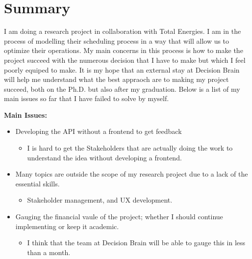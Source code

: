 \section*{Summary}
I am doing a research project in collaboration with Total Energies. I am in the process of modelling 
their scheduling process in a way that will allow us to optimize their operations. My main concerns
in this process is how to make the project succeed with the numerous decision that I have to make but 
which I feel poorly equiped to make. It is my hope that an external stay at Decision Brain will help
me understand what the best appraoch are to making my project succeed, both on the Ph.D. but also 
after my graduation. Below is a list of my main issues so far that I have failed to solve by myself. 

\textbf{Main Issues:}
\begin{itemize}
	\item Developing the API without a frontend to get feedback 
	\begin{itemize}
		\item I is hard to get the Stakeholders that are actually doing the work to understand the idea without developing a frontend.
	\end{itemize}
	\item Many topics are outside the scope of my research project due to a lack of the essential skills. 
	\begin{itemize}
		\item Stakeholder management, and UX development.
	\end{itemize}
	\item Gauging the financial vaule of the project; whether I should continue implementing or keep it academic. 
	\begin{itemize}
		\item I think that the team at Decision Brain will be able to gauge this in less than a month.	
	\end{itemize}
\end{itemize}
